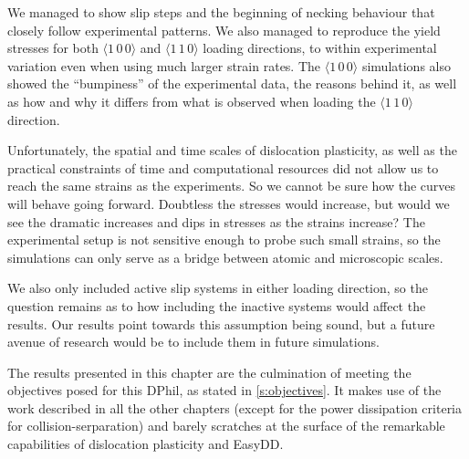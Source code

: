 We managed to show slip steps and the beginning of necking behaviour that closely follow experimental patterns. We also managed to reproduce the yield stresses for both $\langle 1\, 0\, 0 \rangle$ and $\langle 1\, 1\, 0 \rangle$ loading directions, to within experimental variation even when using much larger strain rates. The $\langle 1\, 0\, 0 \rangle$ simulations also showed the ``bumpiness'' of the experimental data, the reasons behind it, as well as how and why it differs from what is observed when loading the $\langle 1\, 1\, 0 \rangle$ direction.

Unfortunately, the spatial and time scales of dislocation plasticity, as well as the practical constraints of time and computational resources did not allow us to reach the same strains as the experiments. So we cannot be sure how the curves will behave going forward. Doubtless the stresses would increase, but would we see the dramatic increases and dips in stresses as the strains increase? The experimental setup is not sensitive enough to probe such small strains, so the simulations can only serve as a bridge between atomic and microscopic scales.

We also only included active slip systems in either loading direction, so the question remains as to how including the inactive systems would affect the results. Our results point towards this assumption being sound, but a future avenue of research would be to include them in future simulations.

The results presented in this chapter are the culmination of meeting the objectives posed for this DPhil, as stated in \cref{s:objectives}. It makes use of the work described in all the other chapters (except for the power dissipation criteria for collision-serparation) and barely scratches at the surface of the remarkable capabilities of dislocation plasticity and EasyDD.
\savearabiccounter

